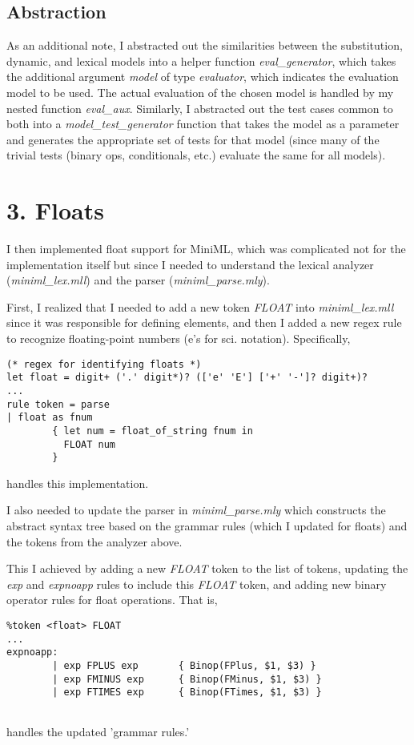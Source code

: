 \documentclass[12pt]{article}
\begin{document}
\subsection*{Abstraction}
As an additional note, I abstracted out the similarities between the substitution, dynamic, and lexical models into a helper function \textit{eval\_generator}, which takes the additional argument \textit{model} of type \textit{evaluator}, which indicates the evaluation model to be used. The actual evaluation of the chosen model is handled by my nested function \textit{eval\_aux}. Similarly, I abstracted out the test cases common to both into a \textit{model\_test\_generator} function that takes the model as a parameter and generates the appropriate set of tests for that model (since many of the trivial tests (binary ops, conditionals, etc.) evaluate the same for all models).

\section*{3. Floats}
I then implemented float support for MiniML, which was complicated not for the implementation itself but since I needed to understand the lexical analyzer (\textit{miniml\_lex.mll}) and the parser (\textit{miniml\_parse.mly}). 

First, I realized that I needed to add a new token \textit{FLOAT} into \textit{miniml\_lex.mll} since it was responsible for defining elements, and then I added a new regex rule to recognize floating-point numbers (e's for sci. notation). Specifically,

\begin{verbatim}
(* regex for identifying floats *)
let float = digit+ ('.' digit*)? (['e' 'E'] ['+' '-']? digit+)?
...
rule token = parse
| float as fnum
        { let num = float_of_string fnum in
          FLOAT num
        }
\end{verbatim}
handles this implementation.

I also needed to update the parser in \textit{miniml\_parse.mly} which constructs the abstract syntax tree based on the grammar rules (which I updated for floats) and the tokens from the analyzer above.

This I achieved by adding a new \textit{FLOAT} token to the list of tokens, updating the \textit{exp} and \textit{expnoapp} rules to include this \textit{FLOAT} token, and adding new binary operator rules for float operations. That is,

\begin{verbatim}
%token <float> FLOAT
...
expnoapp:
        | exp FPLUS exp       { Binop(FPlus, $1, $3) }
        | exp FMINUS exp      { Binop(FMinus, $1, $3) }
        | exp FTIMES exp      { Binop(FTimes, $1, $3) }
    
\end{verbatim}
handles the updated 'grammar rules.'
\end{document}

